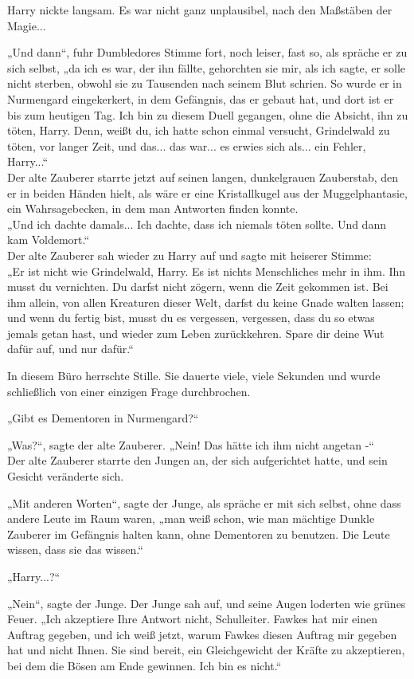 {Harry nickte langsam. Es war nicht ganz unplausibel, nach den Maßstäben der Magie...

„Und dann“, fuhr Dumbledores Stimme fort, noch leiser, fast so, als spräche er zu sich selbst, „da ich es war, der ihn fällte, gehorchten sie mir, als ich sagte, er solle nicht sterben, obwohl sie zu Tausenden nach seinem Blut schrien. So wurde er in Nurmengard eingekerkert, in dem Gefängnis, das er gebaut hat, und dort ist er bis zum heutigen Tag. Ich bin zu diesem Duell gegangen, ohne die Absicht, ihn zu töten, Harry. Denn, weißt du, ich hatte schon einmal versucht, Grindelwald zu töten, vor langer Zeit, und das... das war... es erwies sich als... ein Fehler, Harry...“\\ Der alte Zauberer starrte jetzt auf seinen langen, dunkelgrauen Zauberstab, den er in beiden Händen hielt, als wäre er eine Kristallkugel aus der Muggelphantasie, ein Wahrsagebecken, in dem man Antworten finden konnte.\\ „Und ich dachte damals... Ich dachte, dass ich niemals töten sollte. Und dann kam Voldemort.“\\ Der alte Zauberer sah wieder zu Harry auf und sagte mit heiserer Stimme:\\ „Er ist nicht wie Grindelwald, Harry. Es ist nichts Menschliches mehr in ihm. Ihn musst du vernichten. Du darfst nicht zögern, wenn die Zeit gekommen ist. Bei ihm allein, von allen Kreaturen dieser Welt, darfst du keine Gnade walten lassen; und wenn du fertig bist, musst du es vergessen, vergessen, dass du so etwas jemals getan hast, und wieder zum Leben zurückkehren. Spare dir deine Wut dafür auf, und nur dafür.“

In diesem Büro herrschte Stille. Sie dauerte viele, viele Sekunden und wurde schließlich von einer einzigen Frage durchbrochen.

„Gibt es Dementoren in Nurmengard?“

„Was?“, sagte der alte Zauberer. „Nein! Das hätte ich ihm nicht angetan -“\\ Der alte Zauberer starrte den Jungen an, der sich aufgerichtet hatte, und sein Gesicht veränderte sich.

„Mit anderen Worten“, sagte der Junge, als spräche er mit sich selbst, ohne dass andere Leute im Raum waren, „man weiß schon, wie man mächtige Dunkle Zauberer im Gefängnis halten kann, ohne Dementoren zu benutzen. Die Leute wissen, dass sie das wissen.“

„Harry...?“

„Nein“, sagte der Junge. Der Junge sah auf, und seine Augen loderten wie grünes Feuer. „Ich akzeptiere Ihre Antwort nicht, Schulleiter. Fawkes hat mir einen Auftrag gegeben, und ich weiß jetzt, warum Fawkes diesen Auftrag mir gegeben hat und nicht Ihnen. Sie sind bereit, ein Gleichgewicht der Kräfte zu akzeptieren, bei dem die Bösen am Ende gewinnen. Ich bin es nicht.“

}

